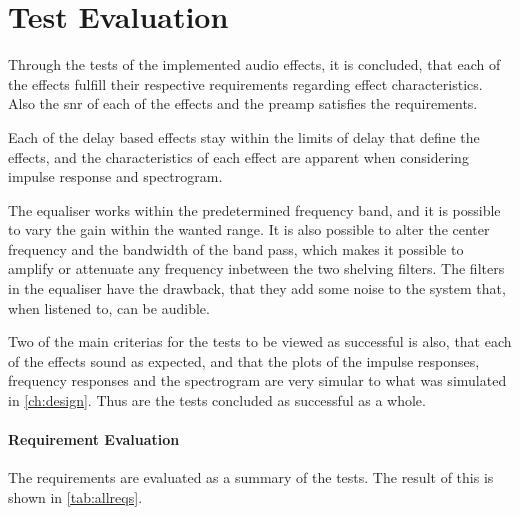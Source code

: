 \section{Test Evaluation}\label{test_eval}
Through the tests of the implemented audio effects, it is concluded, that each of the effects fulfill their respective requirements regarding effect characteristics. Also the \gls{snr} of each of the effects and the \gls{preamp} satisfies the requirements.

Each of the delay based effects stay within the limits of delay that define the effects, and the characteristics of each effect are apparent when considering impulse response and spectrogram. 

The equaliser works within the predetermined frequency band, and it is possible to vary the gain within the wanted range. It is also possible to alter the center frequency and the bandwidth of the band pass, which makes it possible to amplify or attenuate any frequency inbetween the two shelving filters. The filters in the equaliser have the drawback, that they add some noise to the system that, when listened to, can be audible. 

Two of the main criterias for the tests to be viewed as successful is also, that each of the effects sound as expected, and that the plots of the impulse responses, frequency responses and the spectrogram are very simular to what was simulated in \autoref{ch:design}. Thus are the tests concluded as successful as a whole.

\paragraph{Requirement Evaluation}
The requirements are evaluated as a summary of the tests. The result of this is shown in \autoref{tab:allreqs}.

